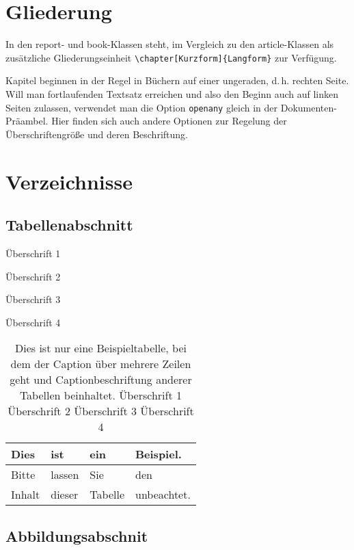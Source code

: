 \documentclass[a4paper,
	openany,							%
	headings = normal,
	toc  	 = chapterentrywithdots,
	listof = totoc,
	listof = entryprefix
]
{scrbook}
\begin{document}
\mainmatter						%

\chapter{Gliederung}

In den report- und book-Klassen steht, im Vergleich zu den article-Klassen als zusätzliche Gliederungseinheit \verb#\chapter[Kurzform]{Langform}# zur Verfügung. 

Kapitel beginnen in der Regel in Büchern auf einer ungeraden, d.\,h. rechten Seite. Will man fortlaufenden Textsatz erreichen und also den Beginn auch auf linken Seiten zulassen, verwendet man die Option \verb#openany# gleich in der Dokumenten-Präambel. Hier finden sich auch andere Optionen zur Regelung der Überschriftengröße und deren Beschriftung.

\chapter{Verzeichnisse}
\label{sec:Verzeichnisse}
\section{Tabellenabschnitt}
\label{sec:Tabellenabschnitt}

\begin{table}[h!]
	\caption{Überschrift 1}
	\caption{Überschrift 2}
	\caption{Überschrift 3}
	\caption{Überschrift 4}
	\caption{Dies ist nur eine Beispieltabelle, bei dem der Caption über mehrere Zeilen geht und Captionbeschriftung anderer Tabellen beinhaltet. Überschrift 1 Überschrift 2 Überschrift 3 Überschrift 4}
	\centering
	\begin{tabular}{|l|l|l|l|}\hline
		Dies & ist & ein & Beispiel.\\\hline
		Bitte & lassen & Sie & den \\\hline
		Inhalt & dieser & Tabelle & unbeachtet.\\\hline
	\end{tabular}
\end{table}

	\section{Abbildungsabschnit}
	\label{sec:Abbildungsabschnit}
\end{document}
